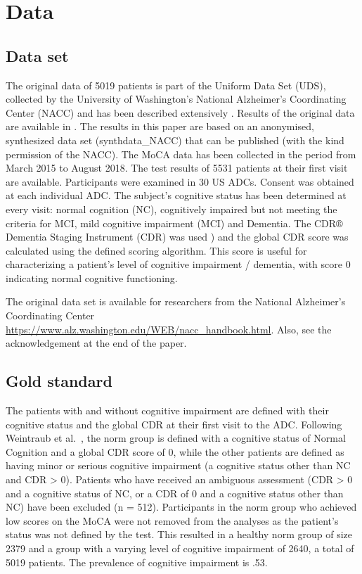 \documentclass[
  nojss]{jss}
\begin{document}
\hypertarget{data}{%
\section{Data}\label{data}}

\hypertarget{data-set}{%
\subsection{Data set}\label{data-set}}

The original data of 5019 patients is part of the Uniform Data Set
(UDS), collected by the University of Washington's National Alzheimer's
Coordinating Center (NACC) and has been described extensively
\citep{beekly_national_2007, weintraub_alzheimers_2009}. Results of the
original data are available in \citep{Landsheer_In_press}. The results
in this paper are based on an anonymised, synthesized data set
(synthdata\_NACC) that can be published (with the kind permission of the
NACC). The MoCA data has been collected in the period from March 2015 to
August 2018. The test results of 5531 patients at their first visit are
available. Participants were examined in 30 US ADCs. Consent was
obtained at each individual ADC. The subject's cognitive status has been
determined at every visit: normal cognition (NC), cognitively impaired
but not meeting the criteria for MCI, mild cognitive impairment (MCI)
and Dementia. The CDR® Dementia Staging Instrument (CDR) was used
\citep{morris_clinical_1997, morris_clinical_1997-1}) and the global CDR
score was calculated using the defined scoring algorithm. This score is
useful for characterizing a patient's level of cognitive impairment /
dementia, with score 0 indicating normal cognitive functioning.

The original data set is available for researchers from the National
Alzheimer's Coordinating Center
\url{https://www.alz.washington.edu/WEB/nacc_handbook.html}. Also, see
the acknowledgement at the end of the paper.

\hypertarget{gold-standard}{%
\subsection{Gold standard}\label{gold-standard}}

The patients with and without cognitive impairment are defined with
their cognitive status and the global CDR at their first visit to the
ADC. Following Weintraub et al.~\citep{weintraub_version_2018}, the norm
group is defined with a cognitive status of Normal Cognition and a
global CDR score of 0, while the other patients are defined as having
minor or serious cognitive impairment (a cognitive status other than NC
and CDR \textgreater{} 0). Patients who have received an ambiguous
assessment (CDR \textgreater{} 0 and a cognitive status of NC, or a CDR
of 0 and a cognitive status other than NC) have been excluded (n = 512).
Participants in the norm group who achieved low scores on the MoCA were
not removed from the analyses as the patient's status was not defined by
the test. This resulted in a healthy norm group of size 2379 and a group
with a varying level of cognitive impairment of 2640, a total of 5019
patients. The prevalence of cognitive impairment is .53.
\end{document}
